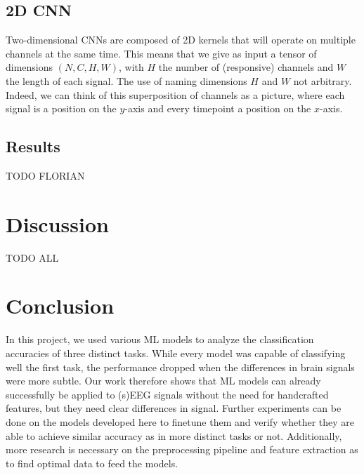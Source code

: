 \documentclass[10pt,conference,compsocconf]{IEEEtran}
\begin{document}
\subsection{2D CNN}
Two-dimensional CNNs are composed of 2D kernels that will operate on multiple channels at the same time. This means that we give as input a tensor of dimensions \((N, C, H, W)\), with \(H\) the number of (responsive) channels and \(W\) the length of each signal. The use of naming dimensions \(H\) and \(W\) not arbitrary. Indeed, we can think of this superposition of channels as a picture, where each signal is a position on the \(y\)-axis and every timepoint a position on the \(x\)-axis.

\subsection{Results}
TODO FLORIAN

\section{Discussion}
\label{sec:discussion}
TODO ALL

\section{Conclusion}
\label{sec:conclusion}
In this project, we used various ML models to analyze the classification accuracies of three distinct tasks. While every model was capable of classifying well the first task, the performance dropped when the differences in brain signals were more subtle. Our work therefore shows that ML models can already successfully be applied to (s)EEG signals without the need for handcrafted features, but they need clear differences in signal. Further experiments can be done on the models developed here to finetune them and verify whether they are able to achieve similar accuracy as in more distinct tasks or not. Additionally, more research is necessary on the preprocessing pipeline and feature extraction as to find optimal data to feed the models.

\newpage
\end{document}

